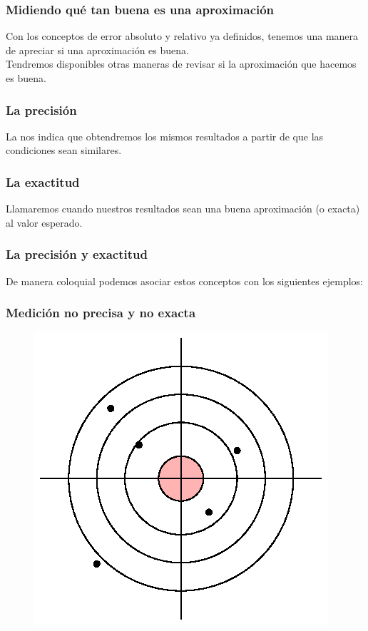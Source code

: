 \documentclass[12pt]{beamer}
\begin{document}
\begin{frame}
\frametitle{Midiendo qué tan buena es una aproximación}
Con los conceptos de error absoluto y relativo ya definidos, tenemos una manera de apreciar si una aproximación es buena.
\\
\bigskip
\pause
Tendremos disponibles otras maneras de revisar si la aproximación que hacemos es buena.
\end{frame}
\begin{frame}
\frametitle{La precisión}
La  nos indica que obtendremos los mismos resultados a partir de que las condiciones sean similares.
\end{frame}
\begin{frame}
\frametitle{La exactitud}
Llamaremos  cuando nuestros resultados sean una buena aproximación (o exacta) al valor esperado.
\end{frame}
\begin{frame}
\frametitle{La precisión y exactitud}
De manera coloquial podemos asociar estos conceptos con los siguientes ejemplos:
\end{frame}
\begin{frame}
\frametitle{Medición no precisa y no exacta}
\begin{figure}
    \centering  
    \includegraphics[scale=1]{Imagenes/exactitud_precision_03.eps}
\end{figure}
\end{frame}
\end{document}
